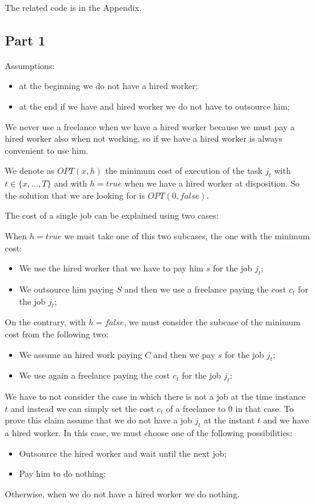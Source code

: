 \documentclass[paper=a4, fontsize=11pt]{scrartcl} %
\numberwithin{equation}{section} %
\numberwithin{figure}{section} %
\numberwithin{table}{section} %
\begin{document}
The related code is in the Appendix.

\subsection*{Part 1}

Assumptions:
\begin{itemize}
    \item at the beginning we do not have a hired worker;
    \item at the end if we have and hired worker we do not have to outsource him;
\end{itemize}

We never use a freelance when we have a hired worker because we must pay a hired worker also when not working, so if we have a hired worker is always convenient to use him.

We denote as $OPT(x, h)$ the minimum cost of execution of the task $j_t$ with $t \in \{x,...,T\}$ and with $h = true$ when we have a hired worker at disposition.
So the solution that we are looking for is $OPT(0, false)$.

The cost of a single job can be explained using two cases:

When $h = true$ we must take one of this two subcases, the one with the minimum cost:
\begin{itemize}
    \item We use the hired worker that we have to pay him $s$ for the job $j_t$;
    \item We outsource him paying $S$ and then we use a freelance paying the cost $c_t$ for the job $j_t$;
\end{itemize}
On the contrary, with $h = false$, we must consider the subcase of the minimum cost from the following two:
\begin{itemize}
    \item We assume an hired work paying $C$ and then we pay $s$ for the job $j_t$;
    \item We use again a freelance paying the cost $c_t$ for the job $j_t$;
\end{itemize}

We have to not consider the case in which there is not a job at the time instance $t$ and instead we can simply set the cost $c_t$ of a freelance to $0$ in that case.
To prove this claim assume that we do not have a job $j_t$ at the instant $t$ and we have a hired worker.
In this case, we must choose one of the following possibilities:
\begin{itemize}
    \item Outsource the hired worker and wait until the next job;
    \item Pay him to do nothing;
\end{itemize}
Otherwise, when we do not have a hired worker we do nothing.
\end{document}
